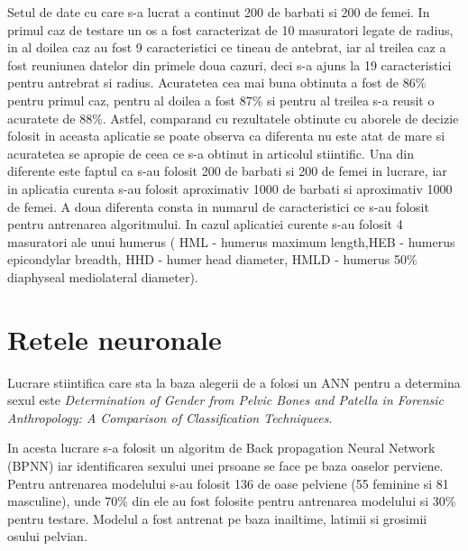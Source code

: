 \documentclass[runningheads,a4paper,11pt]{report}
\begin{document}
\hfill \break
\hfill \break
Setul de date cu care s-a lucrat a continut 200 de barbati si 200 de femei. In primul caz de testare un os a fost caracterizat de 10 masuratori legate de radius, in al doilea caz au fost 9 caracteristici ce tineau de antebrat, iar al treilea caz a fost reuniunea datelor din primele doua cazuri, deci s-a ajuns la 19 caracteristici pentru antrebrat si radius. \newline  \newline
Acuratetea cea mai buna obtinuta a fost de 86\% pentru primul caz, pentru al doilea a fost 87\% si pentru al treilea s-a reusit o acuratete de 88\%. \newline \newline
Astfel, comparand cu rezultatele obtinute cu aborele de decizie folosit in aceasta aplicatie se poate observa ca diferenta nu este atat de mare si acuratetea se apropie de ceea ce s-a obtinut in articolul stiintific. Una din diferente este faptul ca s-au folosit 200 de barbati si 200 de femei in lucrare, iar in aplicatia curenta s-au folosit aproximativ 1000 de barbati si aproximativ 1000 de femei. A doua diferenta consta in numarul de caracteristici ce s-au folosit pentru antrenarea algoritmului. In cazul aplicatiei curente s-au folosit 4 masuratori ale unui humerus ( HML - humerus maximum length,HEB - humerus epicondylar breadth, HHD - humer head diameter, HMLD - humerus 50\% diaphyseal mediolateral diameter). \newline \newline

\section{Retele neuronale}
\label{sotaReteleNeuronale}
Lucrare stiintifica care sta la baza alegerii de a folosi un ANN pentru a determina sexul este \textit{Determination of Gender from Pelvic Bones and Patella in Forensic Anthropology:
A Comparison of Classification Techniquees}. 

\hfill \break

\noindent In acesta lucrare s-a folosit un algoritm de Back propagation Neural Network (BPNN) iar identificarea sexului unei prsoane se face pe baza oaselor perviene. Pentru antrenarea modelului s-au folosit 136 de oase pelviene (55 feminine si 81 masculine), unde 70\% din ele au fost folosite pentru antrenarea modelului si 30\% pentru testare. Modelul a fost antrenat pe baza inailtime, latimii si grosimii osului pelvian. 
\end{document}
